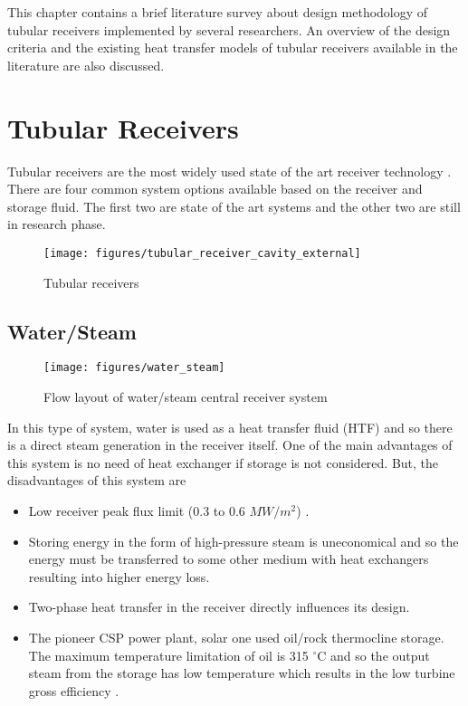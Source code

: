 This chapter contains a brief literature survey about design methodology of tubular receivers implemented by several researchers. An overview of the design criteria and the existing heat transfer models of tubular receivers available in the literature are also discussed.

\section{Tubular Receivers}
Tubular receivers are the most widely used state of the art receiver technology \cite{Goswami.2007}. There are four common system options available based on the receiver and storage fluid. The first two are state of the art systems and the other two are still in research phase.
\begin{figure}[h!]
	\texttt{[image: figures/tubular\_receiver\_cavity\_external]}
	\centering
	\caption{Tubular receivers \cite{Wagner.2008}}
\end{figure}
\subsection{Water/Steam} 
\begin{figure}[h!]
	\texttt{[image: figures/water\_steam]}
	\centering
	\caption{Flow layout of water/steam central receiver system \cite{water_steam}}
\end{figure}
In this type of system, water is used as a heat transfer fluid (HTF) and so there is a direct steam generation in the receiver itself. One of the main advantages of this system is no need of heat exchanger if storage is not considered. But, the disadvantages of this system are
\begin{itemize}
\item Low receiver peak flux limit (0.3 to 0.6 $MW/m^2$) \cite{Falcone.1986}.
\item  Storing energy in the form of high-pressure steam is uneconomical and so the energy must be transferred to some other medium with heat exchangers resulting into higher energy loss.
\item  Two-phase heat transfer in the receiver directly influences its design.
\item  The pioneer CSP power plant, solar one used oil/rock thermocline storage. The maximum temperature limitation of oil is 315 $^{\circ}$C and so the output steam from the storage has low temperature which results in the low turbine gross efficiency \cite{Falcone.1986}.
\end{itemize}
